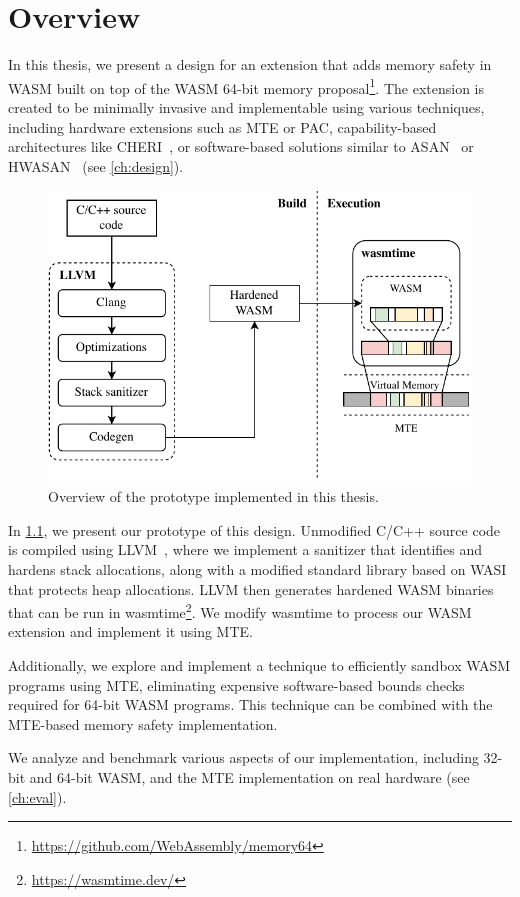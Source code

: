 \chapter{Overview}
\label{ch:overview}

In this thesis, we present a design for an extension that adds memory safety in \ac{WASM} built on top of the \ac{WASM} 64-bit memory proposal\footnote{\url{https://github.com/WebAssembly/memory64}}.
The extension is created to be minimally invasive and implementable using various techniques, including hardware extensions such as \ac{MTE} or \ac{PAC}, capability-based architectures like \ac{CHERI}~\cite{woodruff2014cheri}, or software-based solutions similar to \ac{ASAN}~\cite{serebryany2012addresssanitizer} or \ac{HWASAN}~\cite{serebryany2018memory} (see \cref{ch:design}).


\begin{figure}[ht]
    \centering
    \includegraphics{figures/build/overview-simple}
    \caption{Overview of the prototype implemented in this thesis.}
    \label{fig:system-overview}
\end{figure}

In \cref{fig:system-overview}, we present our prototype of this design.
Unmodified C/C++ source code is compiled using LLVM~\cite{lattner2004llvm}, where we implement a sanitizer that identifies and hardens stack allocations, along with a modified standard library based on \ac{WASI} that protects heap allocations.
LLVM then generates hardened \ac{WASM} binaries that can be run in wasmtime\footnote{\url{https://wasmtime.dev/}}.
We modify wasmtime to process our \ac{WASM} extension and implement it using \ac{MTE}.

Additionally, we explore and implement a technique to efficiently sandbox \ac{WASM} programs using \ac{MTE}, eliminating expensive software-based bounds checks required for 64-bit \ac{WASM} programs.
This technique can be combined with the \ac{MTE}-based memory safety implementation.

We analyze and benchmark various aspects of our implementation, including 32-bit and 64-bit \ac{WASM}, and the \ac{MTE} implementation on real hardware (see \cref{ch:eval}).
